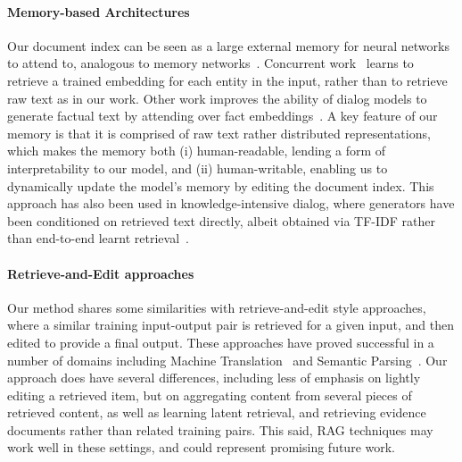 \paragraph{Memory-based Architectures}
Our document index can be seen as a large external memory for neural networks to attend to, analogous to memory networks~\cite{weston2015memory,sukhbaatar2015end}.
Concurrent work~\cite{fevry2020entities} learns to retrieve a trained embedding for each entity in the input, rather than to retrieve raw text as in our work.
Other work improves the ability of dialog models to generate factual text by attending over fact embeddings~\cite{ghazvininejad2018knowledge,fan2020augmenting}. A key feature of our memory is that it is comprised of raw text rather distributed representations, which makes the memory both (i) human-readable, lending a form of interpretability to our model, and (ii) human-writable, enabling us to dynamically update the model's memory by editing the document index. This approach has also been used in knowledge-intensive dialog, where generators have been conditioned on retrieved text directly, albeit obtained via TF-IDF rather than end-to-end learnt retrieval~\cite{dinan2018wizard}.


\paragraph{Retrieve-and-Edit approaches} Our method shares some similarities with retrieve-and-edit style approaches, where a similar training input-output pair is retrieved for a given input, and then edited to provide a final output. These approaches have proved successful in a number of domains including  Machine Translation~ \cite{gu_mt_retrieve_and_edit,hossain-etal-2020-simple} and Semantic Parsing~\cite{NIPS2018_8209}. Our approach does have several differences, including less of emphasis on lightly editing a retrieved item, but on aggregating content from several pieces of retrieved content, as well as learning latent retrieval, and retrieving evidence documents rather than related training pairs. This said, RAG techniques may work well in these settings, and could represent promising future work.


